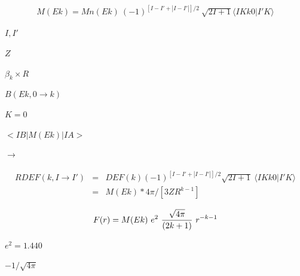 \documentclass[11pt]{article}
\def\lthtmlcheckvsize{\ifdim\ht\sizebox<\vsize 
  \ifdim\wd\sizebox<\hsize\expandafter\hfill\fi \expandafter\vfill
  \else\expandafter\vss\fi}%
\begin{document}
{\newpage\clearpage
{}%
\begin{eqnarray*}
 M(Ek) = Mn(Ek) ~ (-1)^{ [I-I ' +|I-I ' |]/2} ~ \sqrt{2I+1}  \langle IK k0 | I ' K \rangle
\end{eqnarray*}%
\lthtmldisplayZ
\lthtmlcheckvsize\clearpage}

{\newpage\clearpage
{}%
$I,I'$%
\lthtmlindisplaymathZ
\lthtmlcheckvsize\clearpage}

{\newpage\clearpage
{}%
$Z$%
\lthtmlindisplaymathZ
\lthtmlcheckvsize\clearpage}

{\newpage\clearpage
{}%
$\beta_k \times R$%
\lthtmlindisplaymathZ
\lthtmlcheckvsize\clearpage}

{\newpage\clearpage
{}%
$B(Ek, 0 \rightarrow k)$%
\lthtmlindisplaymathZ
\lthtmlcheckvsize\clearpage}

{\newpage\clearpage
{}%
$K=0$%
\lthtmlindisplaymathZ
\lthtmlcheckvsize\clearpage}

{\newpage\clearpage
{}%
$<IB | M(Ek) | IA>$%
\lthtmlindisplaymathZ
\lthtmlcheckvsize\clearpage}

{\newpage\clearpage
{}%
$\rightarrow$%
\lthtmlindisplaymathZ
\lthtmlcheckvsize\clearpage}

{\newpage\clearpage
{}%
\begin{eqnarray*}
   RDEF(k, I \rightarrow I')
         &=& DEF(k) (-1)^{ [I-I'+|I-I'|]/2}  \sqrt{2I+1} ~ \langle IK k0 | I'K\rangle\\
         &=& M(Ek) * 4\pi / [ 3 Z R^{k-1} ]
\end{eqnarray*}%
\lthtmldisplayZ
\lthtmlcheckvsize\clearpage}

{\newpage\clearpage
{}%
\begin{eqnarray*}
      F(r) = M(Ek) ~ e^2 ~ {\sqrt{4\pi}   \over  (2k+1)}~  r^{-k-1}
\end{eqnarray*}%
\lthtmldisplayZ
\lthtmlcheckvsize\clearpage}

{\newpage\clearpage
{}%
$e^2=1.440$%
\lthtmlindisplaymathZ
\lthtmlcheckvsize\clearpage}

{\newpage\clearpage
{}%
$-1/\sqrt{4\pi}$%
\lthtmlindisplaymathZ
\lthtmlcheckvsize\clearpage}
\end{document}

